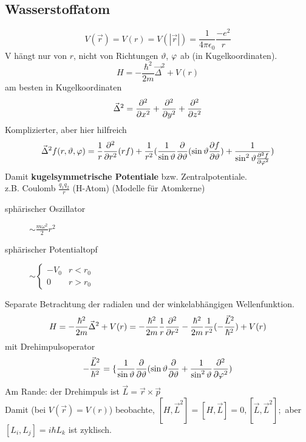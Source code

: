 \subsection{Wasserstoffatom}
$$V(\vec{r}) = V(r) = V(|\vec{r}|) = \frac{1}{4\pi \epsilon_0} \frac{-e^2}{r}$$
V hängt nur von $r$, nicht von Richtungen $\vartheta$, $\varphi$ ab (in Kugelkoordinaten).
$$H = - \frac{\hbar^2}{2m} \vec{\Delta}^2 + V(r)$$
am besten in Kugelkoordinaten
$$\vec{\Delta}^2 = \frac{\partial ^2}{\partial x^2} + \frac{\partial ^2}{\partial y^2} + \frac{\partial ^2}{\partial z^2}$$
Komplizierter, aber hier hilfreich
$$\vec{\Delta}^2 f(r, \vartheta, \varphi) = \frac{1}{r} \frac{\partial ^2}{\partial r^2} (rf) + \frac{1}{r^2} (\frac{1}{\sin \vartheta} \frac{\partial}{\partial \vartheta} (\sin \vartheta \frac{\partial f}{\partial \vartheta}) + \frac{1}{\sin^2 \vartheta \frac{\partial ^2 f}{\partial \varphi^2}})$$
Damit \textbf{kugelsymmetrische Potentiale} bzw. Zentralpotentiale.\\
z.B. Coulomb $\frac{q_1 q_2}{r}$ (H-Atom)
(Modelle für Atomkerne)\\
\begin{description}
	\item[sphärischer Oszillator] $\sim \frac{m \omega^2}{2} r^2$
	\item[sphärischer Potentialtopf] $\sim \begin{cases}
	- V_0 & r < r_0\\
	0 & r > r_0
	\end{cases}$
\end{description}
Separate Betrachtung der radialen und der winkelabhängigen Wellenfunktion.
$$H = - \frac{\hbar^2}{2m} \vec{\Delta}^2 + V(r) = - \frac{\hbar^2}{2m} \frac{1}{r} \frac{\partial ^2}{\partial r^2} - \frac{\hbar^2}{2m} \frac{1}{r^2} (- \frac{\vec{L}^2}{\hbar^2}) + V(r)$$
mit Drehimpulsoperator
$$- \frac{\vec{L}^2}{\hbar^2} = \{\frac{1}{\sin \vartheta} \frac{\partial}{\partial \vartheta} (\sin \vartheta \frac{\partial}{\partial \vartheta} + \frac{1}{\sin^2 \vartheta} \frac{\partial ^2}{\partial \varphi^2})$$
Am Rande: der Drehimpuls ist $\vec{L} = \vec{r} \times \vec{p}$\\
Damit (bei $V(\vec{r}) = V(r)$) beobachte, $[H, \vec{L}^2] = [H, \vec{L}] = 0, [\vec{L}, \vec{L}^2];$ aber $[L_i, L_j] = i \hbar L_k$ ist zyklisch.

